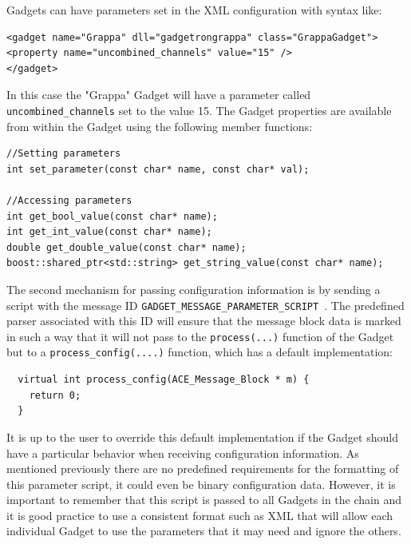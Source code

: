 \documentclass[11pt]{article}
\begin{document}
Gadgets can have parameters set in the XML configuration with syntax like:
{\scriptsize 
\begin{verbatim}
<gadget name="Grappa" dll="gadgetrongrappa" class="GrappaGadget"> 
<property name="uncombined_channels" value="15" />
</gadget>
\end{verbatim}}
\noindent
In this case the "Grappa" Gadget will have a parameter called \texttt{uncombined\_channels} set to the value 15. The Gadget properties are available from within the Gadget using the following member functions:
{\scriptsize 
\begin{verbatim}
//Setting parameters
int set_parameter(const char* name, const char* val);

//Accessing parameters
int get_bool_value(const char* name);
int get_int_value(const char* name);
double get_double_value(const char* name);
boost::shared_ptr<std::string> get_string_value(const char* name);
\end{verbatim}}

The second mechanism for passing configuration information is by sending a script with the message ID \texttt{GADGET\_MESSAGE\_PARAMETER\_SCRIPT }. The predefined parser associated with this ID will ensure that the message block data is marked in such a way that it will not pass to the \texttt{process(...)} function of the Gadget but to a \texttt{process\_config(....)} function, which has a default implementation:
{\scriptsize 
\begin{verbatim}
  virtual int process_config(ACE_Message_Block * m) {
    return 0;
  }
\end{verbatim}}
\noindent
It is up to the user to override this default implementation if the Gadget should have a particular behavior when receiving configuration information. As mentioned previously there are no predefined requirements for the formatting of this parameter script, it could even be binary configuration data. However, it is important to remember that this script is passed to all Gadgets in the chain and it is good practice to use a consistent format such as XML that will allow each individual Gadget to use the parameters that it may need and ignore the others. 
\end{document}
